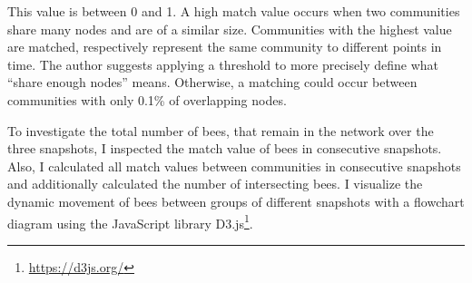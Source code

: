 This value is between 0 and 1. A high match value occurs when two communities share many nodes and are of a similar size. Communities with the highest value are matched, respectively represent the same community to different points in time. The author suggests applying a threshold to more precisely define what ``share enough nodes'' means. Otherwise, a matching could occur between communities with only 0.1\% of overlapping nodes.

To investigate the total number of bees, that remain in the network over the three snapshots, I inspected the match value of bees in consecutive snapshots. Also, I calculated all match values between communities in consecutive snapshots and additionally calculated the number of intersecting bees. I visualize the dynamic movement
of bees between groups of different snapshots with a flowchart diagram using the JavaScript library D3.js\footnote{\url{https://d3js.org/}}.